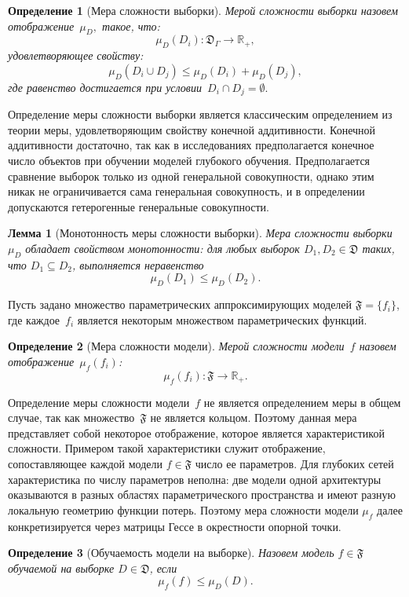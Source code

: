 \documentclass{dissert}
\newtheorem{lemma}[theorem]{Лемма}
\newtheorem{definition}{Определение}
\begin{document}
\begin{definition}[Мера сложности выборки]
    Мерой сложности выборки назовем отображение~$\mu_D,$ такое, что:
    \[
        \mu_D(D_i) : \mathfrak{D}_\Gamma \to \mathbb{R}_+,
    \]
    удовлетворяющее свойству:
    \[
        \mu_D(D_i\cup D_j) \leq \mu_D(D_i)+\mu_D(D_j),
    \]
    где равенство достигается при условии~$D_i\cap D_j=\emptyset.$
\end{definition}
Определение меры сложности выборки является классическим определением из теории меры, удовлетворяющим свойству конечной аддитивности. Конечной аддитивности достаточно, так как в исследованиях предполагается конечное число объектов при обучении моделей глубокого обучения. Предполагается сравнение выборок только из одной генеральной совокупности, однако этим никак не ограничивается сама генеральная совокупность, и в определении допускаются гетерогенные генеральные совокупности.

\begin{lemma}[Монотонность меры сложности выборки]
    Мера сложности выборки~$\mu_D$ обладает свойством монотонности: для любых выборок $D_1, D_2 \in \mathfrak{D}$ таких, что $D_1 \subseteq D_2$, выполняется неравенство
    \[
        \mu_D(D_1) \leq \mu_D(D_2).
    \]
\end{lemma}

Пусть задано множество параметрических аппроксимирующих моделей $\mathfrak{F}=\{f_i\}$, где каждое~$f_i$ является некоторым множеством параметрических функций.

\begin{definition}[Мера сложности модели]
    Мерой сложности модели~$f$ назовем отображение~$\mu_f(f_i)$:
    \[
        \mu_f(f_i) : \mathfrak{F} \to \mathbb{R}_+.
    \]
\end{definition}
Определение меры сложности модели~$f$ не является определением меры в общем случае, так как множество~$\mathfrak{F}$ не является кольцом. Поэтому данная мера представляет собой некоторое отображение, которое является характеристикой сложности.
Примером такой характеристики служит отображение, сопоставляющее каждой модели $f\in\mathfrak{F}$ число ее параметров.
Для глубоких сетей характеристика по числу параметров неполна: две модели одной архитектуры оказываются в разных областях параметрического пространства и имеют разную локальную геометрию функции потерь.
Поэтому мера сложности модели $\mu_f$ далее конкретизируется через матрицы Гессе в окрестности опорной точки.

\begin{definition}[Обучаемость модели на выборке]
    Назовем модель $f\in\mathfrak{F}$ \textit{обучаемой} на выборке $D\in\mathfrak{D}$, если
    \[
        \mu_f(f)\leq \mu_D(D).
    \]
\end{definition}
\end{document}
